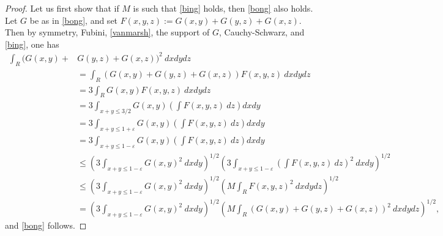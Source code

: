 \documentclass[12pt,a4paper,reqno]{amsart}
\numberwithin{equation}{section}
\theoremstyle{plain}
\theoremstyle{definition}
\newcommand\eps{\varepsilon}
\begin{document}
\begin{proof} Let us first show that if $M$ is such that \eqref{bing} holds, then \eqref{bong} also holds.  Let $G$ be as in \eqref{bong}, and set $F(x,y,z) := G(x,y)+G(y,z) + G(x,z)$.  Then by symmetry, Fubini, \eqref{vanmarsh}, the support of $G$, Cauchy-Schwarz, and \eqref{bing}, one has
\begin{align*}
\int_R (G(x,y)+&G(y,z)+G(x,z))^2\ dx dy dz  \\
&= \int_R (G(x,y)+G(y,z)+G(x,z)) F(x,y,z)\ dx dy dz  \\
&= 3 \int_R G(x,y) F(x,y,z)\ dx dy dz \\
&= 3 \int_{x+y \leq 3/2} G(x,y) (\int F(x,y,z)\ dz) dx dy \\
&= 3 \int_{x+y \leq 1+\eps} G(x,y) (\int F(x,y,z)\ dz) dx dy \\
&= 3 \int_{x+y \leq 1-\eps} G(x,y) (\int F(x,y,z)\ dz) dx dy \\
&\leq (3 \int_{x+y \leq 1-\eps} G(x,y)^2\ dx dy)^{1/2} (3 \int_{x+y \leq 1-\eps} (\int F(x,y,z)\ dz)^2\ dx dy)^{1/2} \\
&\leq (3 \int_{x+y \leq 1-\eps} G(x,y)^2\ dx dy)^{1/2} (M \int_R F(x,y,z)^2\ dx dy dz)^{1/2} \\
&= (3 \int_{x+y \leq 1-\eps} G(x,y)^2\ dx dy)^{1/2} (M \int_R (G(x,y)+G(y,z)+G(x,z))^2\ dx dy dz)^{1/2},
\end{align*}
and \eqref{bong} follows.


\end{proof}
\end{document}
